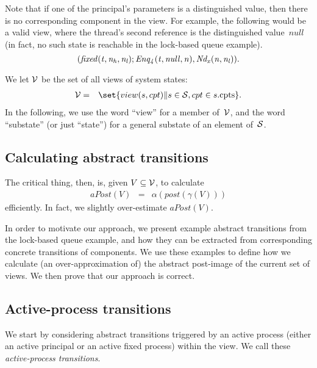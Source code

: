 Note that if one of the principal's parameters is a distinguished value, then
there is no corresponding component in the view.  For example, the following
would be a valid view, where the thread's second reference is the
distinguished value~$null$ (in fact, no such state is reachable in the
lock-based queue example).
\[\it
(fixed(t, n_h, n_l);   Enq_4(t, null, n), \Node_x(n, n_l)).
\]


We let $\V$ be the set of all views of system states:
%
\begin{eqnarray*}
\V & = & 
  \set{view(s, cpt) \| s \in \S, cpt \in s.\cpt}. %
\end{eqnarray*}
%
In the following, we use the word ``view'' for a member of~$\V$, and the word
``substate'' (or just ``state'') for a general substate of an element of~$\S$.


\subsection{Calculating abstract transitions}

The critical thing, then, is, given $V \subseteq \V$, to calculate
\begin{eqnarray*}
aPost(V) & = & \alpha(post(\gamma(V)))
\end{eqnarray*}
efficiently.  In fact, we slightly over-estimate $aPost(V)$.


In order to motivate our approach, we present example abstract transitions
from the lock-based queue example, and how they can be extracted from
corresponding concrete transitions of components.  We use these examples to
define how we calculate (an over-approximation of) the abstract post-image of
the current set of views.  We then prove that our approach is correct.



\subsection{Active-process transitions}

We start by considering abstract transitions triggered by an active process
(either an active principal or an active fixed process) within the view.  We
call these \emph{active-process transitions}.


